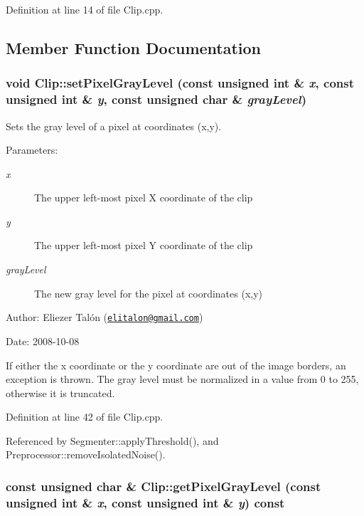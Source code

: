 Definition at line 14 of file Clip.cpp.

\subsection{Member Function Documentation}
\hypertarget{class_clip_454ff6070d0918e56a09a3f28ff430c3}{
\subsubsection[setPixelGrayLevel]{\setlength{\rightskip}{0pt plus 5cm}void Clip::setPixelGrayLevel (const unsigned int \& {\em x}, \/  const unsigned int \& {\em y}, \/  const unsigned char \& {\em grayLevel})}}
\label{class_clip_454ff6070d0918e56a09a3f28ff430c3}


Sets the gray level of a pixel at coordinates (x,y). 

\begin{Desc}
\item[Parameters:]
\begin{description}
\item[{\em x}]The upper left-most pixel X coordinate of the clip \item[{\em y}]The upper left-most pixel Y coordinate of the clip \item[{\em grayLevel}]The new gray level for the pixel at coordinates (x,y)\end{description}
\end{Desc}
\begin{Desc}
\item[Author:]Eliezer Talón (\href{mailto:elitalon@gmail.com}{\tt elitalon@gmail.com}) \end{Desc}
\begin{Desc}
\item[Date:]2008-10-08\end{Desc}
If either the x coordinate or the y coordinate are out of the image borders, an exception is thrown. The gray level must be normalized in a value from 0 to 255, otherwise it is truncated. 

Definition at line 42 of file Clip.cpp.

Referenced by Segmenter::applyThreshold(), and Preprocessor::removeIsolatedNoise().\hypertarget{class_clip_85d16f086803860fae205c48161a3c38}{
\subsubsection[getPixelGrayLevel]{\setlength{\rightskip}{0pt plus 5cm}const unsigned char \& Clip::getPixelGrayLevel (const unsigned int \& {\em x}, \/  const unsigned int \& {\em y}) const}}
\label{class_clip_85d16f086803860fae205c48161a3c38}


